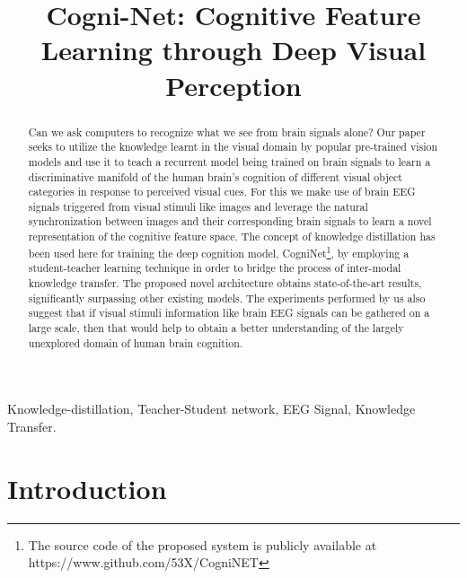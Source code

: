\documentclass{article}
\title{Cogni-Net: Cognitive Feature Learning through Deep Visual Perception}
\begin{document}
%
\maketitle
%
\begin{abstract}
Can we ask computers to recognize what we see from brain signals alone? Our paper seeks to utilize the knowledge learnt in the visual domain by popular pre-trained vision models and use it to teach a recurrent model being trained on brain signals to learn a discriminative manifold of the human brain's cognition of different visual object categories in response to perceived visual cues. For this we make use of brain EEG signals triggered from visual stimuli like images and leverage the natural synchronization between images and their corresponding brain signals to learn a novel representation of the cognitive feature space. The concept of knowledge distillation has been used here for training the deep cognition model, CogniNet\footnote{The source code of the proposed system is publicly available at {https://www.github.com/53X/CogniNET}}, by employing a student-teacher learning technique in order to bridge the process of inter-modal knowledge transfer. The proposed novel architecture obtains state-of-the-art results, significantly surpassing other existing models. The experiments performed by us also suggest that if visual stimuli information like brain EEG signals can be gathered on a large scale, then that would help to obtain a better understanding of the largely unexplored domain of human brain cognition.
\end{abstract}

\begin{keywords}
Knowledge-distillation, Teacher-Student network, EEG Signal, Knowledge Transfer.
\end{keywords}
%
\section{Introduction}\label{sec:intro}
\end{document}
